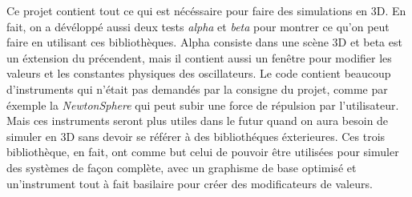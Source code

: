 \documentclass{report}
\begin{document}
Ce projet contient tout ce qui est nécéssaire pour faire des simulations en 3D.
En fait, on a dévéloppé aussi deux tests \textit{alpha} et \textit{beta} pour montrer 
ce qu'on peut faire en utilisant ces bibliothèques.
Alpha consiste dans une scène 3D et beta est un éxtension du précendent, mais il 
contient aussi un fenêtre pour modifier les valeurs et les constantes physiques
des oscillateurs.
Le code contient beaucoup d'instruments qui n'était pas demandés par la
consigne du projet, comme par éxemple la \textit{NewtonSphere} qui peut subir une force
de répulsion par l'utilisateur. Mais ces instruments seront plus utiles dans le
futur quand on aura besoin de simuler en 3D sans devoir se référer à des
bibliothéques éxterieures.
Ces trois bibliothèque, en fait, ont comme but celui de pouvoir être utilisées pour simuler
des systèmes de façon complète, avec un graphisme de base optimisé et
un'instrument tout à fait basilaire pour créer des modificateurs de valeurs.
\end{document}

